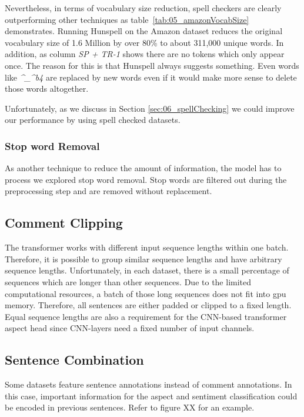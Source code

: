 Nevertheless, in terms of vocabulary size reduction, spell checkers are clearly outperforming other techniques as table~\ref{tab:05_amazonVocabSize} demonstrates. Running Hunspell on the Amazon dataset reduces the original vocabulary size of 1.6 Million by over 80\% to about 311,000 unique words. In addition, as column \textit{SP + TR-1} shows there are no tokens which only appear once. The reason for this is that Hunspell always suggests something. Even words like \textit{\^{}\_\^{}b4} are replaced by new words even if it would make more sense to delete those words altogether.
\medskip

Unfortunately, as we discuss in Section \ref{sec:06_spellChecking} we could improve our performance by using spell checked datasets.

\subsubsection*{Stop word Removal}

As another technique to reduce the amount of information, the model has to process we explored stop word removal. Stop words are filtered out during the preprocessing step and are removed without replacement.

\subsection{Comment Clipping}
\label{subsec:06_CommentClipping}

The transformer works with different input sequence lengths within one batch. Therefore, it is possible to group similar sequence lengths and have arbitrary sequence lengths. Unfortunately, in each dataset, there is a small percentage of sequences which are longer than other sequences. Due to the limited computational resources, a batch of those long sequences does not fit into \gls{gpu} memory. Therefore, all sentences are either padded or clipped to a fixed length. Equal sequence lengths are also a requirement for the CNN-based transformer aspect head since CNN-layers need a fixed number of input channels.

\subsection{Sentence Combination}
\label{sec:05_sentenceCombination}
Some datasets feature sentence annotations instead of comment annotations. In this case, important information for the aspect and sentiment classification could be encoded in previous sentences. Refer to figure XX for an example.
\medskip

